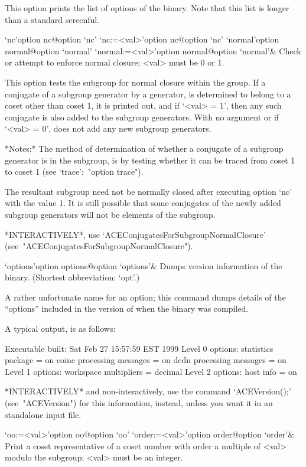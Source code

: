 This option prints the list of options of the {\ACE} binary. Note that
this list is longer than a standard screenful.

\>`nc'{option nc}@{option `nc'}
\>`nc:=<val>'{option nc}@{option `nc'}
\>`normal'{option normal}@{option `normal'}
\>`normal:=<val>'{option normal}@{option `normal'}&
Check or attempt to enforce normal closure; <val> must be 0 or 1.

This option tests the subgroup for normal closure within the group. If
a conjugate of a subgroup generator by a generator, is  determined  to
belong to a coset other than coset 1, it is printed out, and if `<val>
=  1',  then  any  such  conjugate  is  also  added  to  the  subgroup
generators. With no argument or if `<val> = 0', {\ACE}  does  not  add
any new subgroup generators.

*Notes:*
The method of determination of  whether  a  conjugate  of  a  subgroup
generator is in the subgroup, is by testing whether it can  be  traced
from coset 1 to coset 1  (see  `trace':~"option trace").

The resultant subgroup need not be  normally  closed  after  executing
option `nc'  with  the  value  1.  It  is  still  possible  that  some
conjugates of the newly added subgroup generators will not be elements
of the subgroup.

*INTERACTIVELY*,      use      `ACEConjugatesForSubgroupNormalClosure'
(see~"ACEConjugatesForSubgroupNormalClosure").

\>`options'{option options}@{option `options'}&
Dumps version information of the {\ACE} binary.
(Shortest abbreviation: `opt'.)

A rather unfortunate name for an option; this command dumps details of
the ``options'' included in the version  of  {\ACE}  when  the  {\ACE}
binary was compiled.

A typical output, is as follows:

\begintt
Executable built:
  Sat Feb 27 15:57:59 EST 1999
Level 0 options:
  statistics package = on
  coinc processing messages = on
  dedn processing messages = on
Level 1 options:
  workspace multipliers = decimal
Level 2 options:
  host info = on
\endtt

*INTERACTIVELY* and non-interactively, use the command `ACEVersion();'
(see~"ACEVersion") for this information, instead, unless you  want  it
in an {\ACE} standalone input file.

\>`oo:=<val>'{option oo}@{option `oo'}
\>`order:=<val>'{option order}@{option `order'}&
Print a coset representative of a coset number with order  a  multiple
of <val> modulo the subgroup; <val> must be an integer.

